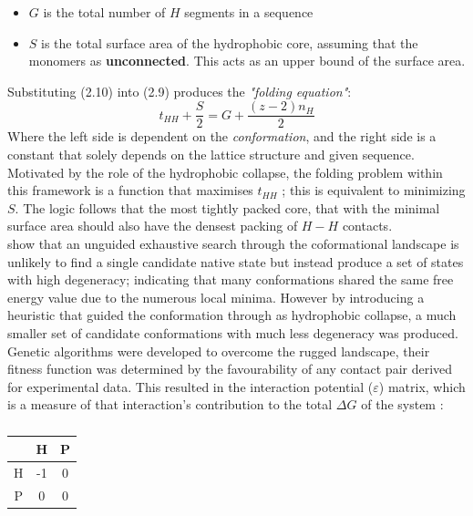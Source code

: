 \begin{itemize}
    \item $G$ is the total number of $H$ segments in a sequence
    \item $S$ is the total surface area of the hydrophobic core, assuming that
        the monomers as \textbf{unconnected}. This acts as an upper bound of the surface
        area.
\end{itemize}

Substituting (2.10) into (2.9) produces the \emph{"folding equation"}:
\begin{equation}
    t_{HH} + \frac{S}{2} = G + \frac{(z-2)n_H}{2}
\end{equation}
Where the left side is dependent on the \emph{conformation}, and the right
side is a constant that solely depends on the lattice structure and given sequence.
Motivated by the role of the hydrophobic collapse, the folding problem within this
framework is a function that maximises $t_{HH}$ ; this is equivalent to
minimizing $S$. The logic follows that the most tightly packed core, that with the minimal
surface area should also have the densest packing of $H-H$ contacts. \\
\cite{Dill,Lau1989} show that an unguided exhaustive search through the coformational
landscape is unlikely to find a single candidate native state but instead produce
a set of states with high degeneracy; indicating that many conformations shared
the same free energy value due to the numerous local minima. However by introducing
a heuristic that guided the conformation through as hydrophobic collapse, a much
smaller set of candidate conformations with much less degeneracy was produced.
Genetic algorithms were developed to overcome the rugged landscape, their fitness
function was determined by the favourability of any contact 
pair derived for experimental data.
This resulted in the interaction potential ($\varepsilon$) matrix, which is a measure of
that interaction's contribution to the total $\Delta G$ of the system \cite{Hoque}:
\begin{table}[!htb]
    \begin{center}
        \caption{}
        \begin{tabular}{|c || c | c|}
            \hline
             & H & P \\
            \hline
            H & -1 & 0 \\
            \hline
            P & 0 & 0 \\
            \hline
        \end{tabular}
    \end{center}
\end{table}\\
